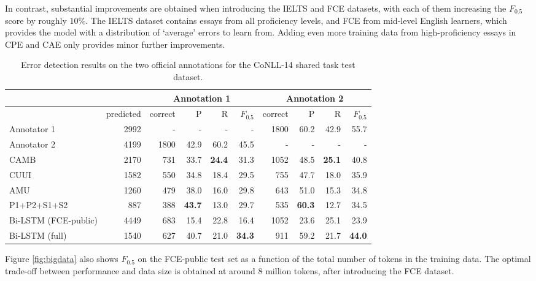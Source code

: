 \documentclass[11pt]{article}
\begin{document}
In contrast, substantial improvements are obtained when introducing the IELTS and FCE datasets, with each of them increasing the $F_{0.5}$ score by roughly $10\%$.
The IELTS dataset contains essays from all proficiency levels, and FCE from mid-level English learners, which provides the model with a distribution of `average' errors to learn from. Adding even more training data from high-proficiency essays in CPE and CAE only provides minor further improvements.




\begin{table*}
\begin{tabular}{lr|rrrr|rrrr} \toprule
 &  & \multicolumn{4}{c|}{Annotation 1} & \multicolumn{4}{c}{Annotation 2} \\ \midrule
 & predicted & correct & P & R & $F_{0.5}$ & correct & P & R & $F_{0.5}$ \\ \midrule
Annotator 1 & 2992 & - & - & - & - & 1800 & 60.2 & 42.9 & 55.7 \\
Annotator 2 & 4199 & 1800 & 42.9 & 60.2 & 45.5 & - & - & - & - \\ \midrule
CAMB & 2170 & 731 & 33.7 & \textbf{24.4} & 31.3 & 1052 & 48.5 & \textbf{25.1} & 40.8 \\
CUUI & 1582 & 550 & 34.8 & 18.4 & 29.5 & 755 & 47.7 & 18.0 & 35.9 \\
AMU  & 1260 & 479 & 38.0 & 16.0 & 29.8 & 643 & 51.0 & 15.3 & 34.8 \\
P1+P2+S1+S2 & 887 & 388 & \textbf{43.7} & 13.0 & 29.7 & 535 & \textbf{60.3} & 12.7 & 34.5 \\ \midrule
Bi-LSTM (FCE-public) & 4449 & 683 & 15.4 & 22.8 & 16.4 & 1052 & 23.6 & 25.1 & 23.9  \\
Bi-LSTM (full) & 1540 & 627 & 40.7 & 21.0 & \textbf{34.3} & 911 & 59.2 & 21.7 & \textbf{44.0} \\ \bottomrule
\end{tabular}
\caption{Error detection results on the two official annotations for the CoNLL-14 shared task test dataset.}
\label{tab:conll}
\end{table*}



Figure \ref{fig:bigdata} also shows $F_{0.5}$ on the FCE-public test set as a function of the total number of tokens in the training data. The optimal trade-off between performance and data size is obtained at around 8 million tokens, after introducing the FCE dataset. 
\end{document}

